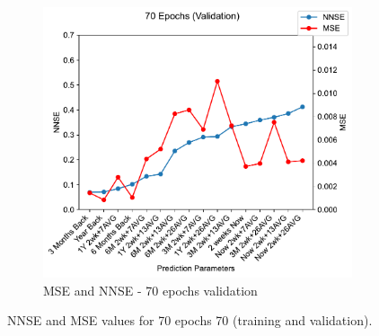 \begin{figure}[p]
\begin{subfigure}[b]{0.49\textwidth}
        \centering\includegraphics[width=1.0\linewidth]{images/70_validation-MSE-and-NNSE.pdf}
        \caption{MSE and NNSE - 70 epochs validation}
        \label{fig:tbd4}
     \end{subfigure}
        \caption{NNSE and MSE values for 70 epochs 70 (training and validation).}
        \label{fig:eq2}
\end{figure}
